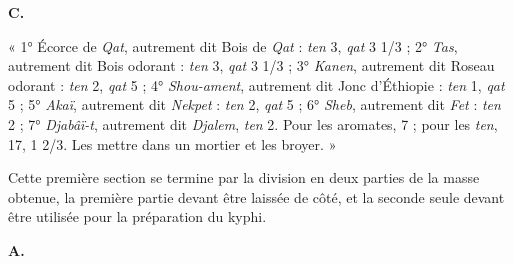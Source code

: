 \documentclass[a4paper, 11pt, oneside, landscape]{article}
\newcommand*\hieroAAAB{}
\newcommand*\hieroAAAH{}
\newcommand*\hieroAAAL{}
\newcommand*\hieroAAAM{}
\newcommand*\hieroAAAR{}
\newcommand*\hieroAABB{}
\newcommand*\hieroAABT{}
\newcommand*\hieroAABV{}
\newcommand*\hieroAACM{}
\newcommand*\hieroAACQ{}
\newcommand*\hieroAADK{}
\newcommand*\hieroAADS{}
\newcommand*\hieroAADT{}
\newcommand*\hieroAAFM{}
\newcommand*\hieroAAFN{}
\newcommand*\hieroAAFO{\raisebox{0.5ex}{}}
\newcommand*\hieroAAFS{}
\newcommand*\hieroAAGA{}
\newcommand*\hieroAAGB{}
\newcommand*\hieroAAGC{}
\newcommand*\hieroAAGD{}
\newcommand*\hieroAAGE{}
\newcommand*\hieroAAGK{}
\newcommand*\hieroAAHD{}
\newcommand*\hieroAAHE{}
\newcommand*\hieroAAHF{}
\newcommand*\hieroAAHG{}
\newcommand*\hieroAAHH{}
\newcommand*\hieroAAHI{}
\newcommand*\hieroAAHJ{}
\newcommand*\hieroAAHK{}
\newcommand*\hieroAAHL{}
\newcommand*\hieroAAHM{}
\newcommand*\hieroAAHN{}
\newcommand*\hieroAAHO{\raisebox{0.6ex}{}}
\newcommand*\hieroAAHP{}
\newcommand*\hieroAAHQ{}
\newcommand*\hieroAAHR{}
\newcommand*\hieroAAHS{}
\newcommand*\hieroAAHT{}
\newcommand*\hieroAAHU{\raisebox{0.7ex}{}}
\newcommand*\hieroAAHV{}
\newcommand*\hieroAAHW{}
\newcommand*\hieroAAHX{}
\newcommand*\hieroAAHY{}
\newcommand*\hieroAAHZ{}
\newcommand*\hieroAAIA{}
\newcommand*\hieroAAIB{\raisebox{1ex}{}}
\newcommand*\hieroAAIC{}
\newcommand*\hieroAAID{}
\newcommand*\hieroAAIE{}
\newcommand*\hieroAAIF{}
\newcommand*\hieroAAIG{}
\newcommand*\hieroAAIH{}
\newcommand*\hieroAAII{}
\newcommand*\hieroAAIJ{}
\newcommand*\hieroAAIK{\raisebox{0.3ex}{}}
\newcommand*\hieroAAIL{}
\newcommand*\hieroAAIM{}
\newcommand*\hieroAAIN{}
\newcommand*\hieroAAIO{}
\newcommand*\hieroAAIP{}
\newcommand*\hieroAAIQ{}
\newcommand*\hieroAAIR{}
\newcommand*\hieroAAIS{}
\newcommand*\hieroAAIT{}
\newcommand*\hieroAAIU{}
\newcommand*\hieroAAIV{}
\begin{document}
\hspace*{10mm}\textbf{C.}\hspace*{5mm} $\hieroAAHD\:\hieroAAHE\:\hieroAAHF\:\hieroAAHG\:\hieroAAGD\:\hieroAAHH\:\hieroAAHI\:\hieroAAHF\:\hieroAAHG\:\hieroAAGD\:\hieroAAFM\:\hieroAAGA\:\hieroAAHJ\:\hieroAAHK$ \hspace*{5mm} $\hieroAAGB\:\hieroAAGC\:\hieroAAGD\:\hieroAAHH\:\hieroAAHL\:\hieroAADK\:\hieroAADK\:\hieroAABV\:\hieroAAFM\:\hieroAAGA\:\hieroAAHJ\:\hieroAAHK$ \hspace*{5mm} $\hieroAAHM\:\hieroAAGD\:\hieroAAHH\:\hieroAAAH\:\hieroAABB\:\hieroAAFS\:\hieroAAGD\:\hieroAADK\:\hieroAADK\:\hieroAAHN\:\hieroAAGA\:\hieroAAHO$ \hspace*{5mm} $\hieroAACM\:\hieroAAFN\:\hieroAAHP\:\hieroAAHH\:\hieroAAHQ\:\hieroAAFO\:\hieroAAHR\:\hieroAAHS\:\hieroAAHT\:\hieroAAHU\:\hieroAAGA\:\hieroAAHO$ \hspace*{5mm} $\hieroAAGE\:\hieroAAAB\:\hieroAAAM\:\hieroAAAM\:\hieroAABV\:\hieroAAHH\:\hieroAAHV\:\hieroAAHW\:\hieroAAHN\:\hieroAAGA\:\hieroAAHO$ \hspace*{5mm} $\hieroAAHX\:\hieroAAHW\:\hieroAAHH\:\hieroAAHY\:\hieroAAFO\:\hieroAAHN$ \hspace*{5mm} $\hieroAAGK\:\hieroAAGD\:\hieroAAHH\:\hieroAAHZ\:\hieroAAIA\:\hieroAAFO\:\hieroAAHN\:\hieroAAIB\:\hieroAADS\:\hieroAADT\:\hieroAAAR\:\hieroAAIC\:\hieroAAID\:\hieroAAIE\:\hieroAAIF\:\hieroAAGA\:\hieroAAIG\:\hieroAAAM\:\hieroAAAL\:\hieroAABT\:\hieroAAIH\:\hieroAAII\:\hieroAAIJ\:\hieroAAIK\:\hieroAAAM\:\hieroAAIL\:\hieroAAIM\:\hieroAAIN$

« 1° Écorce de \emph{Qat}, autrement dit Bois de \emph{Qat} : \emph{ten} 3, \emph{qat} 3 1/3 ; 2° \emph{Tas}, autrement dit Bois odorant : \emph{ten} 3, \emph{qat} 3 1/3 ; 3° \emph{Kanen}, autrement dit Roseau odorant : \emph{ten} 2, \emph{qat} 5 ; 4° \emph{Shou-ament}, autrement dit Jonc d'Éthiopie : \emph{ten} 1, \emph{qat} 5 ; 5° \emph{Akaï}, autrement dit \emph{Nekpet} : \emph{ten} 2, \emph{qat} 5 ; 6° \emph{Sheb}, autrement dit \emph{Fet} : \emph{ten} 2 ; 7° \emph{Djabâï-t}, autrement dit \emph{Djalem}, \emph{ten} 2. Pour les aromates, 7 ; pour les \emph{ten}, 17, 1 2/3. Les mettre dans un mortier et les broyer. »

Cette première section se termine par la division en deux parties de la masse obtenue, la première partie devant être laissée de côté, et la seconde seule devant être utilisée pour la préparation du kyphi.

\hspace*{10mm}\textbf{A.}\hspace*{5mm} $\hieroAACQ\:\hieroAAIO\:\hieroAAIP\:\hieroAAIQ\:\hieroAAIR\:\hieroAAIS\:\hieroAAIT\:\hieroAAIU\:\hieroAAGA\:\hieroAAIV$
\end{document}

